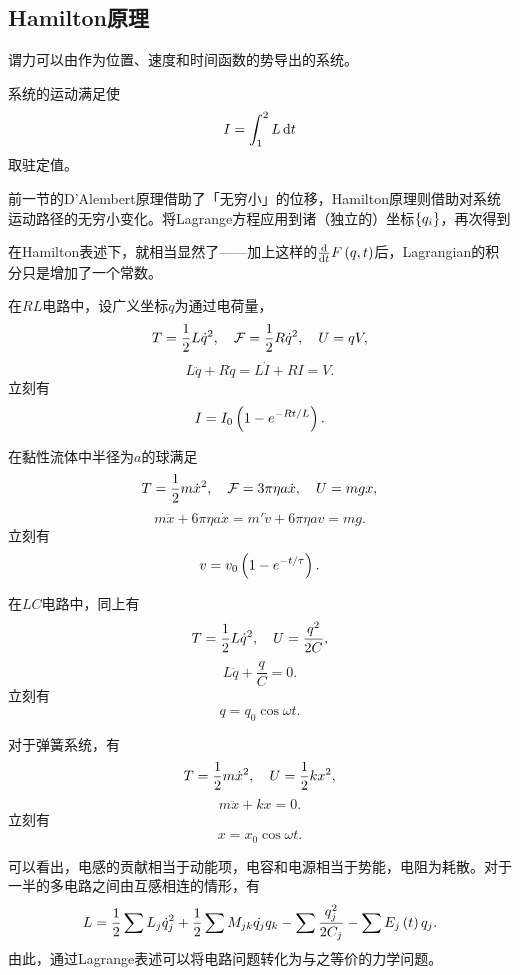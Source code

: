 \documentclass{ctexrep}
\begin{document}
\subsection{Hamilton原理}
谓力可以由作为位置、速度和时间函数的势导出的系统。
\begin{ass}[Hamilton原理]
  系统的运动满足使
  \[ I=\int_1^2 L\, \mathrm{d} t \]
  取驻定值。
\end{ass}
前一节的D'Alembert原理借助了「无穷小」的位移，Hamilton原理则借助对系统运动路径的无穷小变化。将Lagrange方程应用到诸（独立的）坐标$\left\{q_i\right\}$，再次得到
\begin{remark}
  在Hamilton表述下，就相当显然了——加上这样的$\frac{\mathrm{d}}{\mathrm{d} t} F\left(q,t\right)$后，Lagrangian的积分只是增加了一个常数。
\end{remark}
\begin{ex}
\label{ex:RLlagrange}
  在$RL$电路中，设广义坐标$q$为通过电荷量，
  \[ T = \frac{1}{2} L\dot{q}^2, \quad \mathcal{F} = \frac{1}{2} R\dot{q}^2, \quad U=qV, \]
  \[ L\ddot{q} + R\dot{q} = L\dot{I} + RI = V. \]
  立刻有
  \[ I = I_0 \left(1-e^{-Rt/L}\right). \]
\end{ex}
\begin{ex}
  在黏性流体中半径为$a$的球满足
  \[ T = \frac{1}{2} m \dot{x}^2, \quad \mathcal{F}=3\pi\eta a\dot{x}, \quad U=mgx, \]
  \[ m\ddot{x} + 6\pi\eta a\dot{x} = m'\dot{v} + 6\pi\eta a v = mg. \]
  立刻有
  \[ v=v_0\left(1-e^{-t/\tau}\right). \]
\end{ex}
\begin{ex}
\label{ex:LClagrange}
  在$LC$电路中，同上有
  \[ T = \frac{1}{2} L\dot{q}^2, \quad U=\frac{q^2}{2C}, \]
  \[ L\ddot{q} + \frac{q}{C} = 0. \]
  立刻有
  \[ q=q_0 \cos \omega t. \]
\end{ex}
\begin{ex}
  对于弹簧系统，有
  \[ T = \frac{1}{2} m\dot{x}^2, \quad U = \frac{1}{2} k x^2, \]
  \[ m\ddot{x} + kx = 0. \]
  立刻有
  \[ x=x_0 \cos\omega t. \]
\end{ex}
可以看出，电感的贡献相当于动能项，电容和电源相当于势能，电阻为耗散。对于一半的多电路之间由互感相连的情形，有
\[ L = \frac{1}{2} \sum L_j \dot{q}_j^2 + \frac{1}{2} \sum M_{jk}\dot{q_j}{q_k} - \sum \frac{q_j^2}{2C_j} - \sum E_j\left(t\right)q_j. \]
由此，通过Lagrange表述可以将电路问题转化为与之等价的力学问题。
\end{document}
